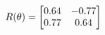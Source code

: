 \documentclass[preview]{standalone}
\begin{document}
\begin{align*}
\special{dvisvgm:raw <g id='unique000'>}R(\theta) = \begin{bmatrix}0.64 & -0.77\\0.77 & 0.64\end{bmatrix}\special{dvisvgm:raw </g>}
\end{align*}
\end{document}
